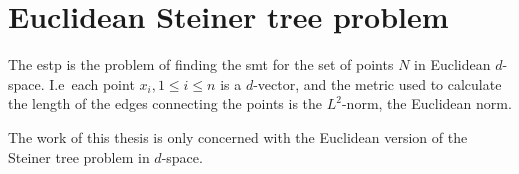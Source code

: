 
\section{Euclidean Steiner tree problem}
\label{sec:eucl-stein-tree}

The \gls{estp} is the problem of finding the \gls{smt} for the set of points $N$
in Euclidean $d$-space. I.e\ each point $x_{i}, 1 \le i \le n$ is a $d$-vector,
and the metric used to calculate the length of the edges connecting the points
is the $L^2$-norm, the Euclidean norm.

The work of this thesis is only concerned with the Euclidean version of the
Steiner tree problem in $d$-space.

\chapterbreak{}

